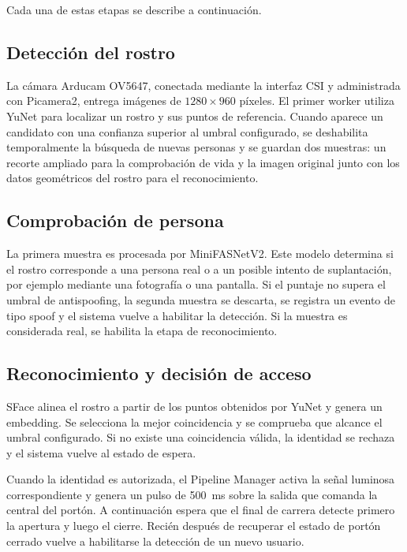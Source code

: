 Cada una de estas etapas se describe a continuación.

\subsection{Detección del rostro}

La cámara Arducam OV5647, conectada mediante la interfaz CSI y administrada con Picamera2, entrega imágenes de $1280 \times 960$ píxeles. El primer worker utiliza YuNet para localizar un rostro y sus puntos de referencia. Cuando aparece un candidato con una confianza superior al umbral configurado, se deshabilita temporalmente la búsqueda de nuevas personas y se guardan dos muestras: un recorte ampliado para la comprobación de vida y la imagen original junto con los datos geométricos del rostro para el reconocimiento.

\subsection{Comprobación de persona}

La primera muestra es procesada por MiniFASNetV2. Este modelo determina si el rostro corresponde a una persona real o a un posible intento de suplantación, por ejemplo mediante una fotografía o una pantalla. Si el puntaje no supera el umbral de antispoofing, la segunda muestra se descarta, se registra un evento de tipo spoof y el sistema vuelve a habilitar la detección. Si la muestra es considerada real, se habilita la etapa de reconocimiento.

\subsection{Reconocimiento y decisión de acceso}

SFace alinea el rostro a partir de los puntos obtenidos por YuNet y genera un embedding. Se selecciona la mejor coincidencia y se comprueba que alcance el umbral configurado. Si no existe una coincidencia válida, la identidad se rechaza y el sistema vuelve al estado de espera.

Cuando la identidad es autorizada, el Pipeline Manager activa la señal luminosa correspondiente y genera un pulso de 500~ms sobre la salida que comanda la central del portón. A continuación espera que el final de carrera detecte primero la apertura y luego el cierre. Recién después de recuperar el estado de portón cerrado vuelve a habilitarse la detección de un nuevo usuario.

